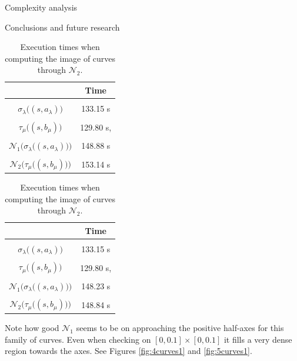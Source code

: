 \documentclass[11pt, a4paper, english, twoside, notitlepage, openright]{report}
\begin{document}
\begin{chapter}{Complexity analysis}
\begin{section}{Conclusions and future research}
\begin{table}[ht!]
\parbox{.45\linewidth}{
\centering
\begin{tabular}{c || c }
 & Time  \\ \hline \hline
\\[-1em]
$\sigma_{\lambda}\big((s, a_\lambda)\big)$ &  133.15 s\\ \hline
\\[-1em]
$\tau_{\mu}\big((s, b_\mu)\big)$ &129.80 s, \\ \hline
\\[-1em]
$\mathcal{N}_1\big(\sigma_{\lambda}\big((s, a_\lambda)\big)\big)$ & 148.88 s \\ \hline
\\[-1em]
$\mathcal{N}_2\big(\tau_{\mu}\big((s, b_\mu)\big)\big)$ & 153.14 s \\
\end{tabular}
\caption{Execution times when computing the image of curves through $\mathcal{N}_1$.}\label{tab:curvesNew1}
}
\hfill
\parbox{.45\linewidth}{
\centering
\begin{tabular}{c || c }
 & Time  \\ \hline \hline
\\[-1em]
$\sigma_{\lambda}\big((s, a_\lambda)\big)$ &  133.15 s\\ \hline
\\[-1em]
$\tau_{\mu}\big((s, b_\mu)\big)$ &129.80 s, \\ \hline
\\[-1em]
$\mathcal{N}_1\big(\sigma_{\lambda}\big((s, a_\lambda)\big)\big)$ & 148.23 s  \\ \hline
\\[-1em]
$\mathcal{N}_2\big(\tau_{\mu}\big((s, b_\mu)\big)\big)$ & 148.84 s \\
\end{tabular}
\caption{Execution times when computing the image of curves through $\mathcal{N}_2$.}\label{tab:curvesNew2}
}
\end{table}

Note how good $\mathcal{N}_1$ seems to be on approaching the positive half-axes for this family of curves. Even when checking on $[0, 0.1]\times[0, 0.1]$ it fills a very dense region towards the axes. See Figures \ref{fig:4curves1} and \ref{fig:5curves1}.


\end{section}
\end{chapter}
\end{document}
